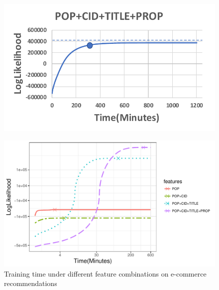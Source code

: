 \begin{figure}[!htb]
  \label{fig:3feature}
\endminipage
{}
  \includegraphics[width=\linewidth]{fig/4feature_lik}
  \label{fig:4feature}
\endminipage
\end{figure}

\begin{figure}[htb]
\includegraphics[width=0.9\columnwidth,height=0.5\columnwidth]{fig/Lik_time}
\caption{Training time under different feature combinations on e-commerce recommendations}
\label{fig:train_time_cmp}
\end{figure}


